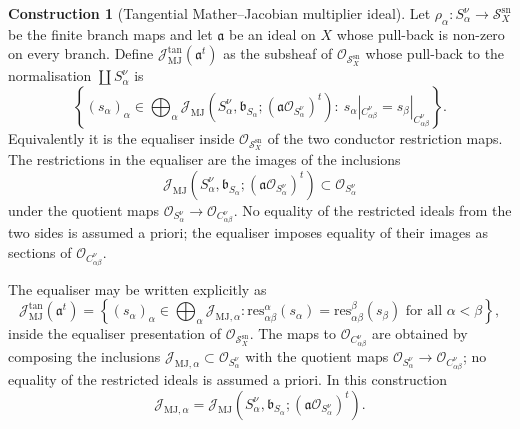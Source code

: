 \documentclass[11pt]{amsart}
\numberwithin{equation}{section}
\theoremstyle{plain}
\theoremstyle{definition}
\newtheorem{Construction}[Theorem]{Construction}
\newcommand{\MJ}{\mathrm{MJ}}
\newcommand{\sn}{\mathrm{sn}}
\newcommand{\bbound}{\mathfrak b}
\newcommand{\cO}{\mathcal O}
\newcommand{\cJ}{\mathcal J}
\newcommand{\sS}{\mathscr S}
\begin{document}
\begin{Construction}[Tangential Mather--Jacobian multiplier ideal]
Let $\rho_\alpha:S_\alpha^\nu\to\sS_X^{\sn}$ be the finite branch maps and let $\mathfrak a$ be an ideal on $X$ whose pull-back is non-zero on every branch.  Define $\cJ^{\tan}_{\MJ}(\mathfrak a^t)$ as the subsheaf of $\cO_{\sS_X^{\sn}}$ whose pull-back to the normalisation $\coprod S_\alpha^\nu$ is
\[
\left\{(s_\alpha)_\alpha\in\bigoplus_\alpha
\cJ_{\MJ}(S_\alpha^\nu,\bbound_{S_\alpha};(\mathfrak a\cO_{S_\alpha^\nu})^t)
:\ s_\alpha|_{C_{\alpha\beta}^\nu}=s_\beta|_{C_{\alpha\beta}^\nu}\right\}.
\]
Equivalently it is the equaliser inside $\cO_{\sS_X^{\sn}}$ of the two conductor restriction maps.
The restrictions in the equaliser are the images of the inclusions
\[
\cJ_{\MJ}(S_\alpha^\nu,\bbound_{S_\alpha};(\mathfrak a\cO_{S_\alpha^\nu})^t)\subset \cO_{S_\alpha^\nu}
\]
under the quotient maps \(\cO_{S_\alpha^\nu}\to\cO_{C_{\alpha\beta}^\nu}\).  No equality of the restricted ideals from the two sides is assumed a priori; the equaliser imposes equality of their images as sections of \(\cO_{C_{\alpha\beta}^\nu}\).
\end{Construction}


The equaliser may be written explicitly as
\begin{equation}\label{eq:mj-equaliser-ideal}
\cJ^{\tan}_{\MJ}(\mathfrak a^t)=
\left\{(s_\alpha)_\alpha\in\bigoplus_\alpha \cJ_{\MJ,\alpha}:
\mathrm{res}_{\alpha\beta}^{\alpha}(s_\alpha)=
\mathrm{res}_{\alpha\beta}^{\beta}(s_\beta)\text{ for all }\alpha<\beta
\right\},
\end{equation}
inside the equaliser presentation of $\cO_{\sS_X^{\sn}}$.  The maps to $\cO_{C_{\alpha\beta}^\nu}$ are obtained by composing the inclusions $\cJ_{\MJ,\alpha}\subset\cO_{S_\alpha^\nu}$ with the quotient maps $\cO_{S_\alpha^\nu}\to\cO_{C_{\alpha\beta}^\nu}$; no equality of the restricted ideals is assumed a priori.  In this construction
\[
\cJ_{\MJ,\alpha}=
\cJ_{\MJ}(S_\alpha^\nu,\bbound_{S_\alpha};(\mathfrak a\cO_{S_\alpha^\nu})^t).
\]

\begin{center}
\end{center}
\end{document}
